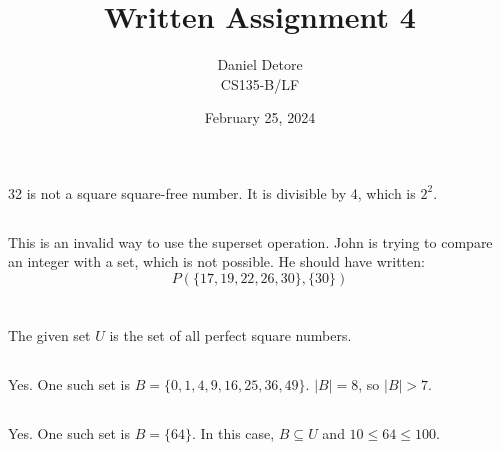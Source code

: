 \documentclass{article}
\title{Written Assignment 4}
\author{Daniel Detore\\CS135-B/LF}
\date{February 25, 2024}
\begin{document}
\maketitle

\section{}
\subsection{}
32 is not a square square-free number. It is divisible by 4, which is $ 2^2 $. 

\subsection{}
This is an invalid way to use the superset operation. John is trying to compare an integer with a set, which is not possible. He should have written:
\begin{equation*}
P (\{17, 19, 22, 26, 30\}, \{30\})
\end{equation*}

\section{}
The given set $U$ is the set of all perfect square numbers.

\subsection{}
Yes. One such set is $B = \{0, 1, 4, 9, 16, 25, 36, 49\}$. $|B| = 8$, so $|B| > 7$.

\subsection{}
Yes. One such set is $B = \{64\}$. In this case, $B \subseteq U$ and $10 \leq 64 \leq 100$.

\section{}
\end{document}
